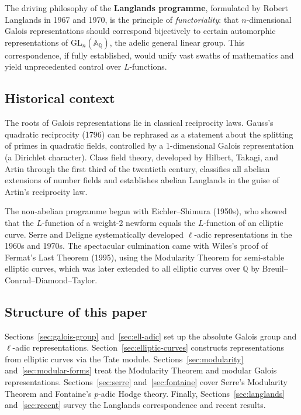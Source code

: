 \documentclass[a4paper,12pt]{amsart}
\theoremstyle{definition}
\theoremstyle{remark}
\newcommand{\Q}{\mathbb{Q}}
\newcommand{\GL}{\mathrm{GL}}
\begin{document}
The driving philosophy of the \textbf{Langlands programme}, formulated by Robert
Langlands in 1967 and 1970, is the principle of \emph{functoriality}: that
$n$-dimensional Galois representations should correspond bijectively to certain
automorphic representations of $\GL_n(\mathbb{A}_\Q)$, the adelic general linear
group. This correspondence, if fully established, would unify vast swaths of
mathematics and yield unprecedented control over $L$-functions.

\subsection*{Historical context}

The roots of Galois representations lie in classical reciprocity laws. Gauss's
quadratic reciprocity (1796) can be rephrased as a statement about the splitting
of primes in quadratic fields, controlled by a 1-dimensional Galois representation
(a Dirichlet character). Class field theory, developed by Hilbert, Takagi, and
Artin through the first third of the twentieth century, classifies all abelian
extensions of number fields and establishes abelian Langlands in the guise of
Artin's reciprocity law.

The non-abelian programme began with Eichler--Shimura (1950s), who showed that the
$L$-function of a weight-2 newform equals the $L$-function of an elliptic curve.
Serre and Deligne systematically developed $\ell$-adic representations in the 1960s
and 1970s. The spectacular culmination came with Wiles's proof of Fermat's Last
Theorem (1995), using the Modularity Theorem for semi-stable elliptic curves, which
was later extended to all elliptic curves over $\Q$ by Breuil--Conrad--Diamond--Taylor.

\subsection*{Structure of this paper}

Sections~\ref{sec:galois-group} and~\ref{sec:ell-adic} set up the absolute Galois
group and $\ell$-adic representations. Section~\ref{sec:elliptic-curves} constructs
representations from elliptic curves via the Tate module. Sections~\ref{sec:modularity}
and~\ref{sec:modular-forms} treat the Modularity Theorem and modular Galois
representations. Sections~\ref{sec:serre} and~\ref{sec:fontaine} cover Serre's
Modularity Theorem and Fontaine's $p$-adic Hodge theory. Finally,
Sections~\ref{sec:langlands} and~\ref{sec:recent} survey the Langlands correspondence
and recent results.
\end{document}
